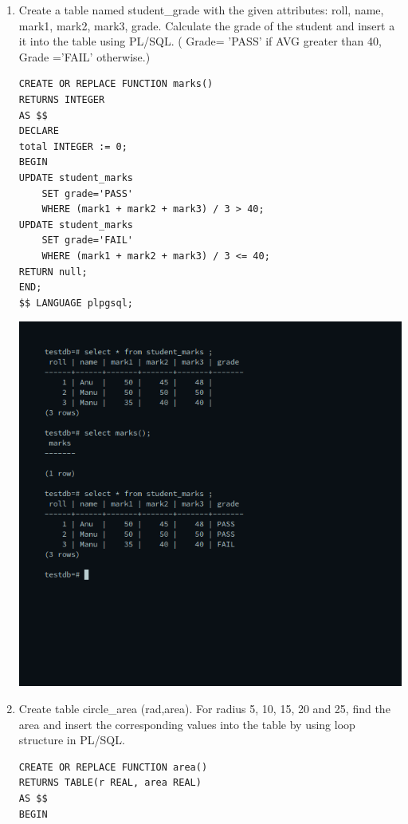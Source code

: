 \begin{enumerate}
\item Create a table named student\_grade with the given attributes: roll, name, mark1, mark2, mark3, grade. Calculate the grade of the student and insert a it into the table using PL/SQL. ( Grade= 'PASS' if AVG greater than 40, Grade ='FAIL' otherwise.)\newline
\begin{verbatim}
CREATE OR REPLACE FUNCTION marks()
RETURNS INTEGER
AS $$
DECLARE
total INTEGER := 0;
BEGIN
UPDATE student_marks 
	SET grade='PASS' 
	WHERE (mark1 + mark2 + mark3) / 3 > 40;
UPDATE student_marks 
	SET grade='FAIL' 
	WHERE (mark1 + mark2 + mark3) / 3 <= 40;
RETURN null;
END;
$$ LANGUAGE plpgsql;
\end{verbatim}
\newline
\includegraphics[width=\linewidth]{../Images/Plsql/3.png}

\item Create table circle\_area (rad,area). For radius 5, 10, 15, 20 and 25, find the area and insert the corresponding values into the table by using loop structure in PL/SQL.\newline
\begin{verbatim}
CREATE OR REPLACE FUNCTION area()
RETURNS TABLE(r REAL, area REAL)
AS $$
BEGIN


\end{verbatim}
\end{enumerate}
